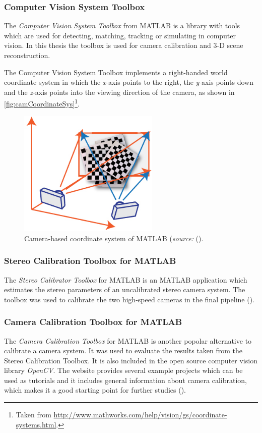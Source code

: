 \subsubsection{Computer Vision System Toolbox}
The \textit{Computer Vision System Toolbox } from MATLAB is a library with tools which are used for detecting, matching, tracking or simulating in computer vision. In this thesis the toolbox is used for camera calibration and 3-D scene reconstruction. 

The Computer Vision System Toolbox implements a right-handed world coordinate system in which the \textit{x}-axis points to the right, the \textit{y}-axis points down and the \textit{z}-axis points into the viewing direction of the camera, as shown in \autoref{fig:camCoordinateSys}\footnote{Taken from \url{http://www.mathworks.com/help/vision/gs/coordinate-systems.html}.}.

\begin{figure}[htbp]
		\centering
		\includegraphics[width=0.6\textwidth]{figures/camCalibPosition}
		\caption[Camera-based coordinate system of MATLAB]{Camera-based coordinate system of MATLAB (\textit{source:} (\cite{StereoCalib.2016}).}
		\label{fig:camCoordinateSys}
\end{figure}

\subsubsection{Stereo Calibration Toolbox for MATLAB}\label{ssec:stereoCalibToolbox}
The \textit{Stereo Calibrator Toolbox} for MATLAB is an MATLAB application which estimates the stereo parameters of an uncalibrated stereo camera system. The toolbox was used to calibrate the two high-speed cameras in the final pipeline (\cite{StereoCalib.2016}).

\subsubsection{Camera Calibration Toolbox for MATLAB}
The \textit{Camera Calibration Toolbox} for MATLAB is another popolar alternative to calibrate a camera system. It was used to evaluate the results taken from the Stereo Calibration Toolbox. It is also included in the open source computer vision library \textit{OpenCV}. The website provides several example projects which can be used as tutorials and it includes general information about camera calibration, which makes it a good starting point for further studies (\cite{Bouguet.2015}).

